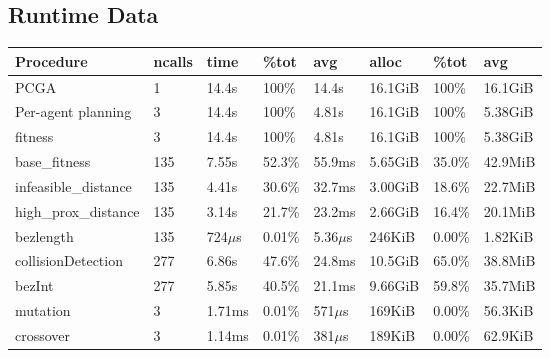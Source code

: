 \begin{appendices}

  \chapter{Runtime Data}
  \begin{table}
    \begin{tabular}{l l l l l l l l}
       Procedure &ncalls     &time   &\%tot     &avg     &alloc   &\%tot      &avg\\
\hline
PCGA                        &   1  &  14.4s &  100\% &  14.4s   &16.1GiB  &100\%   &16.1GiB\\
  \hspace{6pt} Per-agent planning &   3  &  14.4s &  100\% &  4.81s   &16.1GiB  &100\%   &5.38GiB\\
     \hspace{12pt}fitness                     &   3  &  14.4s &  100\% &  4.81s   &16.1GiB  &100\%   &5.38GiB\\
       \hspace{24pt}base\_fitness              & 135  &  7.55s & 52.3\% & 55.9ms   &5.65GiB  &35.0\%  &42.9MiB\\
         \hspace{30pt}infeasible\_distance     & 135  &  4.41s & 30.6\% & 32.7ms   &3.00GiB  &18.6\%  &22.7MiB\\
         \hspace{30pt}high\_prox\_distance      & 135  &  3.14s & 21.7\% & 23.2ms   &2.66GiB  &16.4\%  &20.1MiB\\
         \hspace{30pt}bezlength               & 135  &  724\(\mu\)s & 0.01\% & 5.36\(\mu\)s   & 246KiB  &0.00\%  &1.82KiB\\
       \hspace{24pt}collisionDetection        & 277  &  6.86s & 47.6\% & 24.8ms   &10.5GiB  &65.0\%  &38.8MiB\\
         \hspace{30pt}bezInt                  & 277  &  5.85s & 40.5\% & 21.1ms   &9.66GiB  &59.8\%  &35.7MiB\\
     \hspace{12pt}mutation                    &   3  & 1.71ms & 0.01\% &  571\(\mu\)s   & 169KiB  &0.00\%  &56.3KiB\\
     \hspace{12pt}crossover                   &   3  & 1.14ms & 0.01\% &  381\(\mu\)s   & 189KiB  &0.00\%  &62.9KiB\\

\end{tabular}
\end{table}
\end{appendices}
